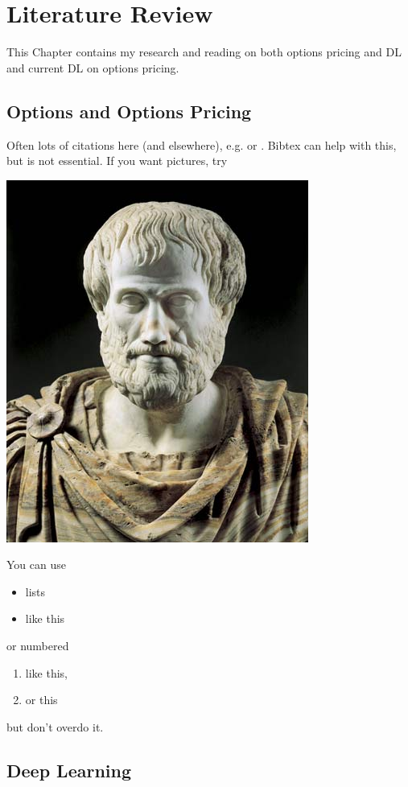 \documentclass{report}
\begin{document}
\chapter{Literature Review}

This Chapter contains my research and reading on both options pricing and DL and current DL on options pricing.

\section{Options and Options Pricing}
Often lots of citations here (and elsewhere), e.g. \cite{Rey:D} or \cite[Theorem 2.3]{PriorNOP70}.   Bibtex can help with this, but is not essential. If you want pictures, try

\begin{center}
\includegraphics[scale=.5]{aristotle.jpg}
\end{center}
You can use 
\begin{itemize}
\item lists
\item like this
\end{itemize}
or numbered
\begin{enumerate}
\item like this,
\item or this
\end{enumerate}
but don't overdo it.

\section{Deep Learning}
\end{document}
